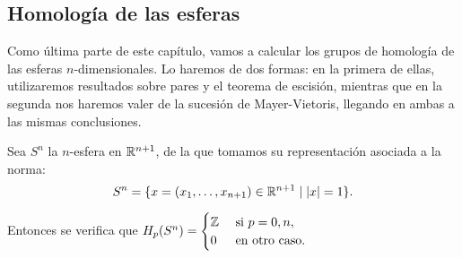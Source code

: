 \subsection{Homología de las esferas}

Como última parte de este capítulo, vamos a calcular los grupos de homología de las esferas
$n$-dimensionales. Lo haremos de dos formas: en la primera de ellas, utilizaremos resultados
sobre pares y el teorema de escisión, mientras que en la segunda nos haremos valer de la
sucesión de Mayer-Vietoris, llegando en ambas a las mismas conclusiones.

\begin{theorem}
  Sea $S^n$ la $n$-esfera en $\mathbb{R}^{n+1}$, de la que tomamos su representación asociada a la norma:
  \[S^n = \{x = (x_1, \dots, x_{n+1}) \in \mathbb{R}^{n+1} \mid |x| = 1\}. \]

  Entonces se verifica que $H_p(S^n) = \begin{cases}  \mathbb{Z} & \text{ si } p = 0, n, \\
                                         0 & \text{ en otro caso.} \end{cases}$
\end{theorem}

